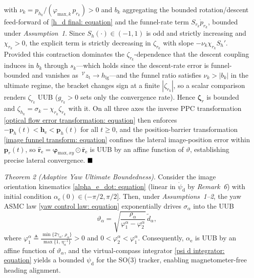 \documentclass{IEEEtaes}
\begin{document}
with $\nu_k=p_{h_k}/(\varphi_{\text{max},k}\,p_{r_k})>0$ and $b_k$ aggregating the bounded rotation/descent feed-forward of \eqref{h_d final: equation} and the funnel-rate term $S_{r_k}\dot{p}_{r_k}$, bounded under \textit{Assumption~1}. Since $S_h(\cdot)\in(-1,1)$ is odd and strictly increasing and $\chi_{r_k}>0$, the explicit term is strictly decreasing in $\zeta_{r_k}$ with slope $-\nu_k\chi_{r_k}S_h'$. Provided this contraction dominates the $\zeta_{r_k}$-dependence that the descent coupling induces in $b_k$ through $s_k$---which holds since the descent-rate error is funnel-bounded and vanishes as $\,^\mathcal{V}z_\text{t}\to h_\text{lg}$---and the funnel ratio satisfies $\nu_k>|b_k|$ in the ultimate regime, the bracket changes sign at a finite $|\zeta_{r_k}|$, so a scalar comparison renders $\zeta_{r_k}$ UUB ($g_{r_k}>0$ sets only the convergence rate). Hence $\boldsymbol{\zeta}_r$ is bounded and $\zeta_{h_k}=\sigma_k-\chi_{r_k}\zeta_{r_k}$ with it. On all three axes the inverse PPC transformation \eqref{optical flow error transformation: equation} then enforces $-\boldsymbol{p}_h(t)<\boldsymbol{h}_\text{e}<\boldsymbol{p}_h(t)$ for all $t\ge 0$, and the position-barrier transformation \eqref{image funnel transform: equation} confines the lateral image-position error within $\boldsymbol{p}_r(t)$, so $\hat{\boldsymbol{r}}_\text{e}=\boldsymbol{\varphi}_{\text{max},xy}\odot\bar{\boldsymbol{r}}_\text{e}$ is UUB by an affine function of $\vartheta$, establishing precise lateral convergence. $\hfill\blacksquare$

\textit{Theorem 2 (Adaptive Yaw Ultimate Boundedness).}
Consider the image orientation kinematics \eqref{alpha_e_dot: equation} (linear in $\dot{\psi}_\text{d}$ by \textit{Remark~6}) with initial condition $\alpha_\text{e}(0)\in(-\pi/2,\pi/2]$. Then, under \textit{Assumptions~1--2}, the yaw ASMC law \eqref{yaw control law: equation} exponentially drives $\sigma_\alpha$ into the UUB
\begin{equation} \label{yaw UUB bound: equation}
    \vartheta_\alpha = \sqrt{\frac{\rho_\alpha}{\varphi_1^\alpha-\varphi_2^\alpha}}\,\tilde{d}_\alpha,
\end{equation}
where $\varphi_1^\alpha \triangleq \frac{\min\{2\gamma_\alpha,\,\rho_\alpha\}}{\max\{1,\,\eta_\alpha^{-1}\}}>0$ and $0<\varphi_2^\alpha<\varphi_1^\alpha$. Consequently, $\alpha_\text{e}$ is UUB by an affine function of $\vartheta_\alpha$, and the virtual-compass integrator \eqref{psi d integrator: equation} yields a bounded $\psi_\text{d}$ for the SO(3) tracker, enabling magnetometer-free heading alignment.
\end{document}
